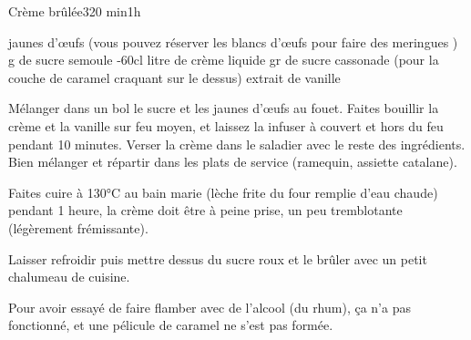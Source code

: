 \begin{recette}{Crème brûlée}{3}{20 min}{1h}
\begin{ingredients}[5 pers.]
 jaunes d'œufs (vous pouvez réserver les blancs d'œufs pour faire des meringues )
 g de sucre semoule
-60cl litre de crème liquide
 gr de sucre cassonade (pour la couche de caramel craquant sur le dessus)
\ingredient extrait de vanille
\end{ingredients}

\begin{preparation}
\etape Mélanger dans un bol le sucre et les jaunes d'œufs au fouet.
\etape Faites bouillir la crème et la vanille sur feu moyen, et laissez la infuser à couvert et hors du feu pendant 10 minutes.
\etape Verser la crème dans le saladier avec le reste des ingrédients.
\etape Bien mélanger et répartir dans les plats de service (ramequin, assiette catalane).
\end{preparation}

\begin{cuisson}
Faites cuire à 130°C au bain marie (lèche frite du four remplie d'eau chaude) pendant 1 heure, la crème doit être à peine prise, un peu tremblotante (légèrement frémissante).

Laisser refroidir puis mettre dessus du sucre roux et le brûler avec un petit chalumeau de cuisine. 
\begin{remarque}
Pour avoir essayé de faire flamber avec de l'alcool (du rhum), ça n'a pas fonctionné, et une pélicule de caramel ne s'est pas formée.
\end{remarque}

\end{cuisson}


\end{recette}

